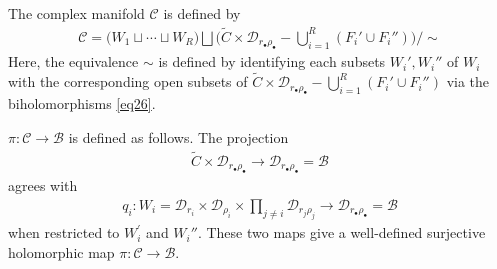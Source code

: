 \documentclass[11pt,b5paper,notitlepage]{article}
\theoremstyle{definition}
\theoremstyle{plain}
\newcommand{\wtd}{\widetilde}
\newcommand{\blt}{\bullet}
\newcommand{\<}{\left\langle}
\renewcommand{\>}{\right\rangle}
\newcommand{\MC}{\mathcal{C}}
\newcommand{\MB}{\mathcal{B}}
\newcommand{\MD}{\mathcal{D}}
\numberwithin{equation}{section}
\begin{document}
The complex manifold $\MC$ is defined by 
\begin{gather}
\MC=\big(W_1\sqcup\cdots\sqcup W_R\big)\bigsqcup \big(\wtd C\times \MD_{r_\blt \rho_\blt}-\bigcup_{i=1}^R( F_i'\cup F_i'')\big)\Big/\sim
\end{gather}
Here, the equivalence $\sim$ is defined by identifying each subsets $W_i',W_i''$ of $W_i$ with the corresponding open subsets of $\wtd C\times \MD_{r_\blt \rho_\blt}-\bigcup_{i=1}^R( F_i'\cup F_i'')$ via the biholomorphisms \eqref{eq26}.

$\pi:\MC\rightarrow \MB$ is defined as follows. The projection
\begin{align*}
    \wtd C\times \MD_{r_\blt \rho_\blt}\rightarrow \MD_{r_\blt \rho_\blt}=\MB
\end{align*}
agrees with
\begin{align*}
q_i:W_i=\MD_{r_i}\times \MD_{\rho_i}\times \prod_{j\ne i} \MD_{r_j\rho_j}\rightarrow \MD_{r_\blt \rho_\blt}=\MB
\end{align*}
when restricted to $W_i^\prime$ and $W_i''$. These two maps give a well-defined surjective holomorphic map $\pi:\MC\rightarrow \MB$.

\end{document}
